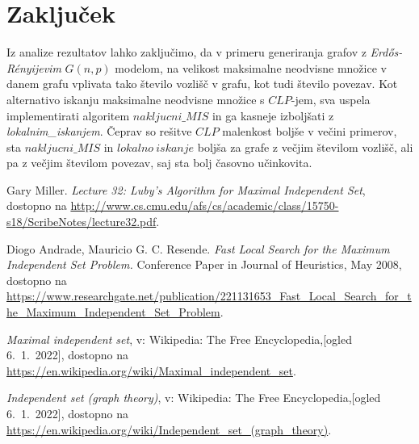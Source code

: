 \documentclass[a4paper, 12pt]{article}
\begin{document}
\newpage
\section{Zaključek}

Iz analize rezultatov lahko zaključimo, da v primeru generiranja grafov z \textit{Erdős-Rényijevim} $G(n, p)$ modelom, na velikost maksimalne neodvisne množice v danem grafu
vplivata tako število vozlišč v grafu, kot tudi število povezav. Kot alternativo iskanju maksimalne neodvisne množice s $CLP$-jem, sva uspela implementirati algoritem $nakljucni\_MIS$
in ga kasneje izboljšati z \textit{lokalnim\_iskanjem}. Čeprav so rešitve $CLP$ malenkost boljše v večini primerov, sta $nakljucni\_MIS$ in $lokalno\ iskanje$ boljša za grafe z večjim številom vozlišč,
ali pa z večjim številom povezav, saj sta bolj časovno učinkovita.

\newpage

\begin{thebibliography}{9}    

    Gary Miller.
    \textit{Lecture 32: Luby’s Algorithm for Maximal Independent Set}, dostopno na \url{http://www.cs.cmu.edu/afs/cs/academic/class/15750-s18/ScribeNotes/lecture32.pdf}.

    Diogo Andrade, Mauricio G. C. Resende.
    \textit{Fast Local Search for the Maximum Independent Set Problem.} Conference Paper in Journal of Heuristics, May 2008, 
    dostopno na \url{https://www.researchgate.net/publication/221131653_Fast_Local_Search_for_the_Maximum_Independent_Set_Problem}.

    \textit{Maximal independent set}, v: Wikipedia: The Free Encyclopedia,[ogled 6.~1.~2022], dostopno na \url{https://en.wikipedia.org/wiki/Maximal_independent_set}.

    \textit{Independent set (graph theory)}, v: Wikipedia: The Free Encyclopedia,[ogled 6.~1.~2022], dostopno na \url{https://en.wikipedia.org/wiki/Independent_set_(graph_theory)}.

    
\end{thebibliography}
\end{document}
